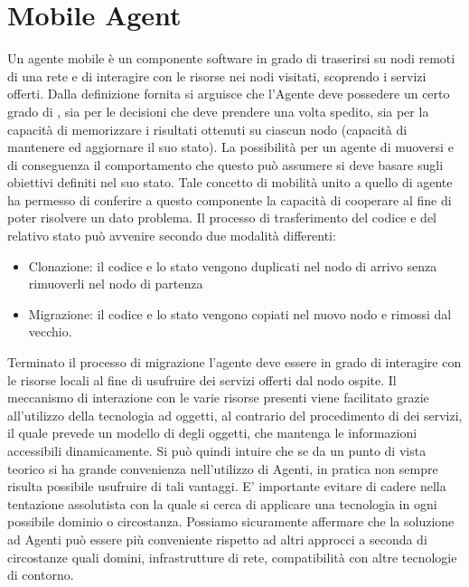 \section{Mobile Agent}
Un agente mobile è un componente software in grado di traserirsi su nodi remoti di una rete e di interagire con le risorse nei nodi visitati, scoprendo i servizi offerti.
Dalla definizione fornita si arguisce che l'Agente deve possedere un certo grado di , sia per le decisioni che deve prendere una volta spedito, sia per la capacità di memorizzare i risultati ottenuti su ciascun nodo (capacità di mantenere ed aggiornare il suo stato).
La possibilità per un agente di muoversi e di conseguenza il comportamento che questo può assumere si deve basare sugli obiettivi definiti nel suo stato. Tale concetto di mobilità unito a quello di agente ha permesso di conferire a questo componente la capacità di cooperare al fine di poter risolvere un dato problema.
Il processo di trasferimento del codice e del relativo stato può avvenire secondo due modalità differenti:
\begin{itemize}
\item Clonazione: il codice e lo stato vengono duplicati nel nodo di arrivo senza rimuoverli nel nodo di partenza
\item Migrazione: il codice e lo stato vengono copiati nel nuovo nodo e rimossi dal vecchio. 
\end{itemize}
Terminato il processo di migrazione l'agente deve essere in grado di interagire con le risorse locali al fine di usufruire dei servizi offerti dal nodo ospite.
Il meccanismo di interazione con le varie risorse presenti viene facilitato grazie all'utilizzo della tecnologia ad oggetti, al contrario del procedimento di  dei servizi, il quale prevede un modello di    degli oggetti, che mantenga le informazioni accessibili dinamicamente.
Si può quindi intuire che se da un punto di vista teorico si ha grande convenienza nell’utilizzo di Agenti, in pratica non sempre risulta possibile usufruire di tali vantaggi. E’ importante evitare di cadere nella tentazione assolutista con la quale si cerca di applicare una tecnologia in ogni possibile dominio o circostanza. Possiamo sicuramente affermare che la soluzione ad Agenti può essere più conveniente rispetto ad altri approcci a seconda di circostanze quali domini, infrastrutture di rete, compatibilità con altre
tecnologie di contorno.  

